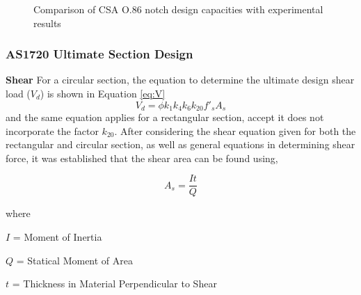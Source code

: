 \documentclass[11pt,a4paper]{article}
\numberwithin{equation}{subsection}
\begin{document}
\vspace*{\baselineskip}

\begin{figure}[h]
	\begin{center}
	\end{center}
	\caption{Comparison of CSA O.86 notch design capacities with experimental results}
	\label{fig:CSA}
\end{figure}

\subsubsection{AS1720 Ultimate Section Design}
\textbf{Shear}
For a circular section, the equation to determine the ultimate design shear load ($V_{d}$) is shown in Equation \ref{eq:V}
	\begin{equation}
	V_{d} = \phi k_{1} k_{4} k_{6} k_{20} f'_{s} A_{s}
	\label{eq:V}
	\end{equation}
\noindent
and the same equation applies for a rectangular section, accept it does not incorporate the factor $k_{20}$. After considering the shear equation given for both the rectangular and circular section, as well as general equations in determining shear force, it was established that the shear area can be found using, 
	
	\begin{equation}
	A_{s} = \frac{It}{Q}
	\label{eq:As}
	\end{equation}

where \par
$ I $ = Moment of Inertia\par
$ Q $ = Statical Moment of Area \par
$ t $ = Thickness in Material Perpendicular to Shear \par
\end{document}
